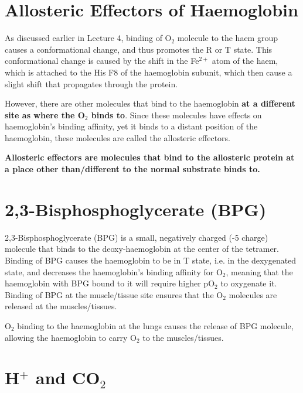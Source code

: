 \section{Allosteric Effectors of Haemoglobin}

As discussed earlier in Lecture 4, binding of O$_2$ molecule to the haem group causes a conformational change, and thus promotes the R or T state.
This conformational change is caused by the shift in the Fe$^{2+}$ atom of the haem, which is attached to the His F8 of the haemoglobin subunit, which then cause a slight shift that propagates through the protein.

However, there are other molecules that bind to the haemoglobin \textbf{at a different site as where the O$_2$ binds to}.
Since these molecules have effects on haemoglobin's binding affinity, yet it binds to a distant position of the haemoglobin, these molecules are called the allosteric effectors.

\vspace{0.3cm}

\begin{center}
\textbf{Allosteric effectors are molecules that bind to the allosteric protein at a place other than/different to the normal substrate binds to.}
\end{center}

\section{2,3-Bisphosphoglycerate (BPG)}

2,3-Bisphosphoglycerate (BPG) is a small, negatively charged (-5 charge) molecule that binds to the deoxy-haemoglobin at the center of the tetramer.
Binding of BPG causes the haemoglobin to be in T state, i.e. in the dexygenated state, and decreases the haemoglobin's binding affinity for O$_2$, meaning that the haemoglobin with BPG bound to it will require higher pO$_2$ to oxygenate it.
Binding of BPG at the muscle/tissue site ensures that the O$_2$ molecules are released at the muscles/tissues.

O$_2$ binding to the haemoglobin at the lungs causes the release of BPG molecule, allowing the haemoglobin to carry O$_2$ to the muscles/tissues.

\begin{center}
\end{center}

\section{H$^+$ and CO$_2$}

